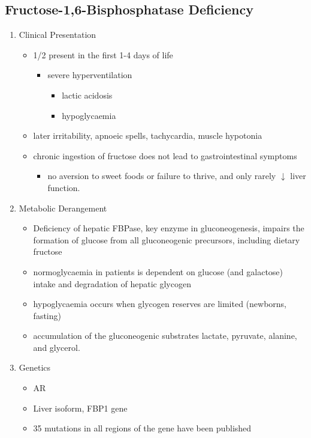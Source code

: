 \documentclass{scrartcl}
\begin{document}
\subsection{Fructose-1,6-Bisphosphatase Deficiency}
\label{sec:org203af0b}
\begin{enumerate}
\item Clinical Presentation
\label{sec:org82bb549}
\begin{itemize}
\item 1/2 present in the first 1-4 days of life
\begin{itemize}
\item severe hyperventilation
\begin{itemize}
\item lactic acidosis
\item hypoglycaemia
\end{itemize}
\end{itemize}
\item later irritability, apnoeic spells, tachycardia, muscle hypotonia
\item chronic ingestion of fructose does not lead to gastrointestinal symptoms
\begin{itemize}
\item no aversion to sweet foods or failure to thrive, and only rarely \(\downarrow\) liver function.
\end{itemize}
\end{itemize}

\item Metabolic Derangement
\label{sec:org7670860}
\begin{itemize}
\item Deficiency of hepatic FBPase, key enzyme in gluconeogenesis, impairs
the formation of glucose from all gluconeogenic precursors, including dietary fructose
\item normoglycaemia in patients is dependent on glucose (and galactose)
intake and degradation of hepatic glycogen
\item hypoglycaemia occurs when glycogen reserves are limited (newborns, fasting)
\item accumulation of the gluconeogenic substrates lactate, pyruvate, alanine, and glycerol.
\end{itemize}
\item Genetics
\label{sec:org479eae1}
\begin{itemize}
\item AR
\item Liver isoform, FBP1 gene
\item 35 mutations in all regions of the gene have been published
\end{itemize}


\end{enumerate}
\end{document}
